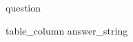 \begin{question}
    {{ question }}

    \begin{tabular}{ {{table_column}} }
        {{ answer_string }}
    \end{tabular}
\end{question}

